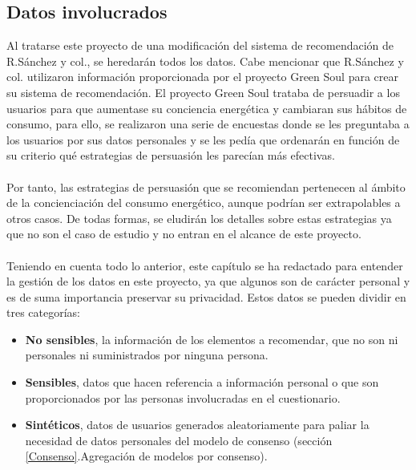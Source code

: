 \subsection{Datos involucrados}
Al tratarse este proyecto de una modificación del sistema de recomendación de R.Sánchez y col., se heredarán todos los datos. Cabe mencionar que R.Sánchez y col. utilizaron información proporcionada por el proyecto Green Soul\autocite{EcoawarePersuasiveNetworked} para crear su sistema de recomendación. El proyecto Green Soul trataba de persuadir a los usuarios para que aumentase su conciencia energética y cambiaran sus hábitos de consumo, para ello, se realizaron una serie de encuestas donde se les preguntaba a los usuarios por sus datos personales y se les pedía que ordenarán en función de su criterio qué estrategias de persuasión les parecían más efectivas.
\\ \\
Por tanto, las estrategias de persuasión que se recomiendan pertenecen al ámbito de la concienciación del consumo energético, aunque podrían ser extrapolables a otros casos. De todas formas, se eludirán los detalles sobre estas estrategias ya que no son el caso de estudio y no entran en el alcance de este proyecto.
\\ \\
Teniendo en cuenta todo lo anterior, este capítulo se ha redactado para entender la gestión de los datos en este proyecto, ya que algunos son de carácter personal y es de suma importancia preservar su privacidad. Estos datos se pueden dividir en tres categorías:
\begin{itemize}
    \item \textbf{No sensibles}, la información de los elementos a recomendar, que no son ni personales ni suministrados por ninguna persona.
    \item  \textbf{Sensibles}, datos que hacen referencia a información personal o que son proporcionados por las personas involucradas en el cuestionario.
    \item \textbf{Sintéticos}, datos de usuarios generados aleatoriamente para paliar la necesidad de datos personales del modelo de consenso (sección \ref{Consenso}.Agregación de modelos por consenso).
\end{itemize} 

